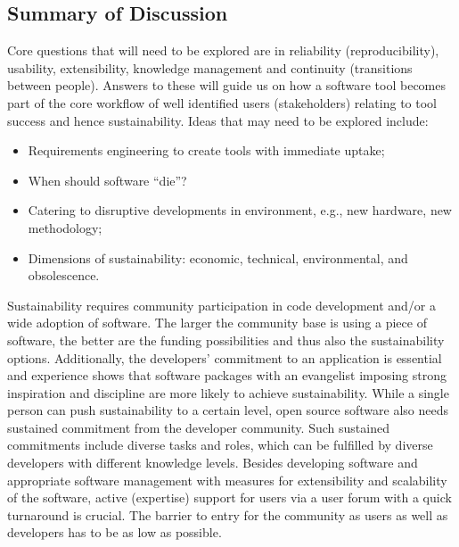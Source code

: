 \subsection{Summary of Discussion}

Core questions that will need to be explored are in reliability (reproducibility), usability, extensibility, knowledge management and continuity (transitions between people). Answers to these will guide us on how a software tool becomes part of the core workflow of well identified users (stakeholders) relating to tool success and hence sustainability.
Ideas that may need to be explored include:
\begin{itemize}

\item Requirements engineering to create tools with immediate uptake;

\item When should software ``die''?

\item Catering to disruptive developments in environment, e.g., new hardware,
new methodology;

\item Dimensions of sustainability: economic, technical, environmental,
and obsolescence.

\end{itemize}

Sustainability requires community participation in code development and/or a
wide adoption of software. The larger the community base is using a piece of
software, the better are the funding possibilities and thus also the
sustainability options. Additionally, the developers’ commitment to an application is
essential and experience shows that software packages with an evangelist
imposing strong inspiration and discipline are more likely to achieve
sustainability. While a single person can push sustainability to a certain
level, open source software also needs sustained commitment from the developer
community. Such sustained commitments include diverse tasks and roles, which can
be fulfilled by diverse developers with different knowledge levels. Besides
developing software and appropriate software management with measures for
extensibility and scalability of the software, active (expertise) support for
users via a user forum with a quick turnaround is crucial. The barrier to entry
for the community as users as well as developers has to be as low as possible.


